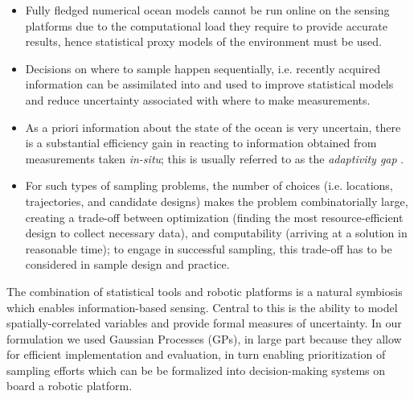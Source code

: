 \documentclass[aoas]{imsart}
\begin{document}
\begin{itemize}
\item Fully fledged numerical ocean models cannot be run online on the sensing platforms due to the computational load they require to provide accurate results, hence statistical proxy models of the environment must be used. 
\item Decisions on where to sample happen sequentially, i.e.  
  recently acquired information can be assimilated into and used to improve statistical models and reduce uncertainty associated with where to make measurements.
\item As a priori information about the state of the ocean is very
  uncertain, there is a substantial efficiency gain in reacting to
  information obtained from measurements taken \emph{in-situ}; this is
  usually referred to as the \emph{adaptivity gap} \citep{Krause2008phd}.
\item For such types of sampling problems, the number of choices (i.e.
  locations, trajectories, and candidate designs) makes the problem
  combinatorially large, creating a trade-off between optimization (finding the most resource-efficient design to collect necessary data), and computability (arriving at a
  solution in reasonable time); to engage in successful sampling, this trade-off has to be considered in sample design and practice.
\end{itemize}{}

The combination of statistical tools and robotic platforms is a natural symbiosis which enables information-based sensing. Central to this is the ability to model spatially-correlated variables and provide formal measures of uncertainty. In our formulation we used Gaussian Processes (GPs), in large part because they allow for efficient implementation and evaluation, in turn enabling prioritization of sampling efforts which can be be formalized into decision-making systems on board a robotic platform.


\end{document}
